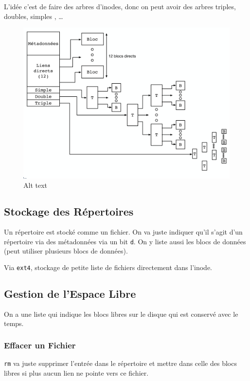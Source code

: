 L'idée c'est de faire des arbres d'inodes, donc on peut avoir des arbres
triples, doubles, simples , \ldots{}

\begin{figure}
\centering
\includegraphics{image-45.png}
\caption{Alt text}
\end{figure}

\subsection{Stockage des Répertoires}\label{stockage-des-ruxe9pertoires}

Un répertoire est stocké comme un fichier. On va juste indiquer qu'il
s'agit d'un répertoire via des métadonnées via un bit \texttt{d}. On y
liste aussi les blocs de données (peut utiliser plusieurs blocs de
données).

Via \texttt{ext4}, stockage de petite liste de fichiers directement dans
l'inode.

\subsection{Gestion de l'Espace Libre}\label{gestion-de-lespace-libre}

On a une liste qui indique les blocs libres sur le disque qui est
conservé avec le temps.

\subsubsection{Effacer un Fichier}\label{effacer-un-fichier}

\texttt{rm} va juste supprimer l'entrée dans le répertoire et mettre
dans celle des blocs libres si plus aucun lien ne pointe vers ce
fichier.

